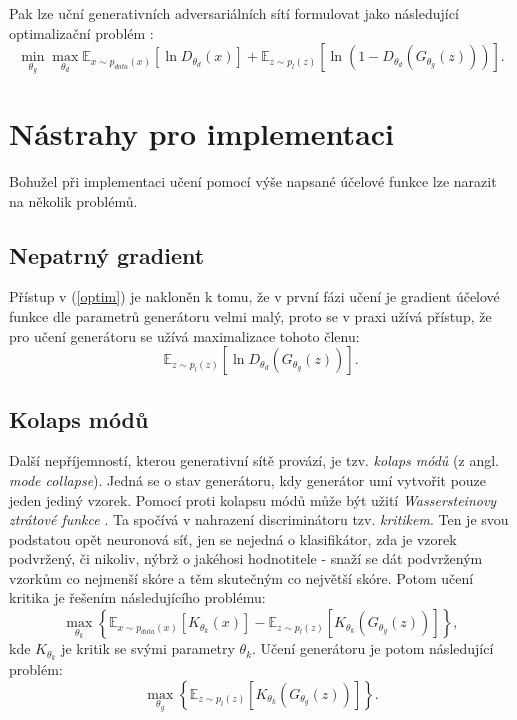 \documentclass[czech]{article}
\begin{document}
Pak lze uční generativních adversariálních sítí formulovat jako následující optimalizační problém \cite{originalpaper}:
\begin{equation} \label{optim}
    \min_{\theta_g} \max_{\theta_d} \mathbb{E}_{x \sim p_{data}(x)} \left[\operatorname{ln} D_{\theta_d} (x)\right]
    + \mathbb{E}_{z \sim p_l(z)} \left[\operatorname{ln} \left(1 - D_{\theta_d}(G_{\theta_g}(z))\right)\right].
\end{equation}

\section{Nástrahy pro implementaci}

Bohužel při implementaci učení pomocí výše napsané účelové funkce lze narazit na několik problémů.

\subsection{Nepatrný gradient}

Přístup v (\ref{optim}) je nakloněn k tomu, že v první fázi učení je gradient účelové funkce dle parametrů generátoru velmi malý,
proto se v praxi užívá přístup, že pro učení generátoru se užívá maximalizace tohoto členu:
\begin{equation}
    \mathbb{E}_{z \sim p_l(z)} \left[\operatorname{ln} D_{\theta_d}\left(G_{\theta_g}(z)\right)\right].
\end{equation}

\subsection{Kolaps módů}

Další nepříjemností, kterou generativní sítě provází, je tzv. \emph{kolaps módů} (z angl. \emph{mode collapse}).
Jedná se o stav generátoru, kdy generátor umí vytvořit pouze jeden jediný vzorek.
Pomocí proti kolapsu módů může být užití \emph{Wassersteinovy ztrátové funkce} \cite{wgan}.
Ta spočívá v nahrazení discriminátoru tzv. \emph{kritikem}.
Ten je svou podstatou opět neuronová síť, jen se nejedná o klasifikátor, zda je vzorek podvržený, či nikoliv,
nýbrž o jakéhosi hodnotitele - snaží se dát podvrženým vzorkům co nejmenší skóre a těm skutečným co největší skóre.
Potom učení kritika je řešením následujícího problému:
\begin{equation}
    \max_{\theta_k} \left\{\mathbb{E}_{x \sim p_{data}(x)} \left[K_{\theta_k} (x)\right]
    - \mathbb{E}_{z \sim p_l(z)} \left[K_{\theta_k}\left(G_{\theta_g}(z)\right)\right]\right\},
\end{equation}
kde $K_{\theta_k}$ je kritik se svými parametry $\theta_k$.
Učení generátoru je potom následující problém:
\begin{equation}
    \max_{\theta_g} \left\{ \mathbb{E}_{z \sim p_l(z)} \left[K_{\theta_k}\left(G_{\theta_g}(z)\right)\right]\right\}.
\end{equation}
\end{document}
